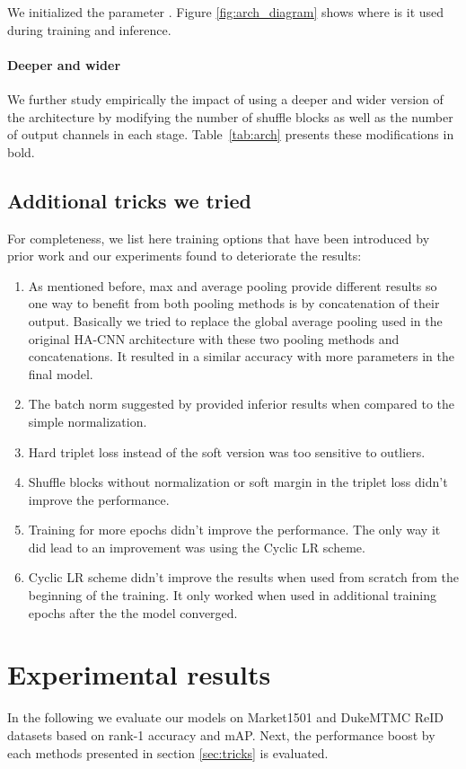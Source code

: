 \documentclass[sigconf]{acmart}
\begin{document}
We initialized the parameter . Figure \ref{fig:arch_diagram} shows where is it used during training and inference.

\paragraph{Deeper and wider}
We further study empirically the impact of using a deeper and wider version of the architecture by modifying the number of shuffle blocks as well as the number of output channels in each stage.
Table~\ref{tab:arch} presents these modifications in bold.

\subsection{Additional tricks we tried}
\label{sec:tried}

For completeness, we list here training options that have been introduced by prior work and our experiments found to deteriorate the results:
\begin{enumerate}
    \item As mentioned before, max and average pooling provide different results so one way to benefit from both pooling methods is by concatenation of their output. Basically we tried to replace the global average pooling used in the original HA-CNN architecture with these two pooling methods and concatenations. It resulted in a similar accuracy with more parameters in the final model.
    \item The batch norm suggested by \cite{luo2019bag} provided inferior results when compared to the simple  normalization.
    \item Hard triplet loss instead of the soft version was too sensitive to outliers.
    \item Shuffle blocks without  normalization or soft margin in the triplet loss didn't improve the performance.
    \item Training for more epochs didn't improve the performance. The only way it did lead to an improvement was using the Cyclic LR scheme.
    \item Cyclic LR scheme didn't improve the results when used from scratch from the beginning of the training. It only worked when used in additional training epochs after the the model converged.
\end{enumerate}


\section{Experimental results}
\label{sec:experiments}
In the following we evaluate our models on Market1501 and DukeMTMC ReID datasets based on rank-1 accuracy and mAP. Next, the performance boost by each methods presented in section \ref{sec:tricks} is evaluated.
\end{document}
